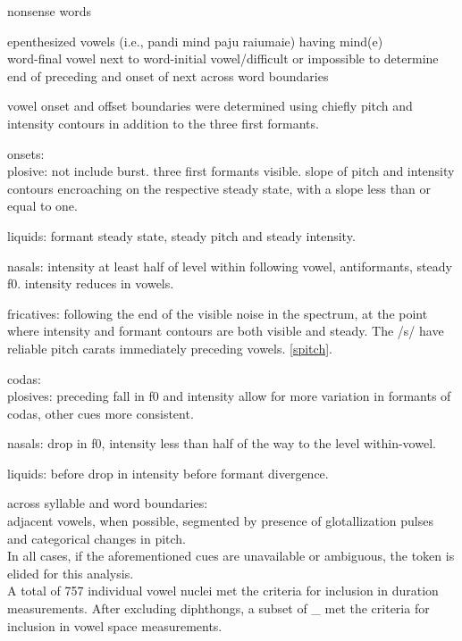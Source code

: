 nonsense words

epenthesized vowels (i.e., pandi mind paju raiumaie) having mind(e) \\
word-final vowel next to word-initial vowel/difficult or impossible to determine end of preceding and onset of next across word boundaries


vowel onset and offset boundaries were determined using chiefly pitch and intensity contours in addition to the three first formants.



onsets: \\

plosive: not include burst. three first formants visible. slope of pitch and intensity contours encroaching on the respective steady state, with a slope less than or equal to one. 

liquids: formant steady state, steady pitch and steady intensity. 

nasals: intensity at least half of level within following vowel, antiformants, steady f0. intensity reduces in vowels. 

fricatives: following the end of the visible noise in the spectrum, at the point where intensity and formant contours are both visible and steady. The /s/  have reliable pitch carats immediately preceding vowels. \ref{spitch}. 

codas: \\

plosives: preceding fall in f0 and intensity
allow for more variation in formants of codas, other cues more consistent.

nasals: drop in f0, intensity less than half of the way to the level within-vowel. 

liquids: before drop in intensity 
before formant divergence.

across syllable and word boundaries: \\

adjacent vowels, when possible, segmented by presence of glotallization pulses and categorical changes in pitch. \\

In all cases, if the aforementioned cues are unavailable or ambiguous, the token is elided for this analysis. \\

A total of 757 individual vowel nuclei met the criteria for inclusion in duration measurements. After excluding diphthongs, a subset of _ met the criteria for inclusion in vowel space measurements. 


